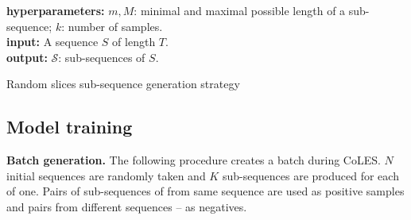 \documentclass[sigconf, anonymous]{acmart}
\begin{document}
\begin{algorithm}
    \SetAlgoLined
    \textbf{hyperparameters:}
        $m, M$: minimal and maximal possible length of a sub-sequence;
        $k$: number of samples.
    \\ %
    \textbf{input:}
        A sequence $S$ of length $T$.
    \\
    \textbf{output:}
        $\mathcal{S}$: sub-sequences of $S$.
    \\
    \BlankLine
    \caption{Random slices sub-sequence generation strategy}
    \label{alg-slce-ss}
\end{algorithm}


\subsection{Model training} \label{sec-training}

\textbf{Batch generation.} The following procedure creates a batch during CoLES. $N$ initial
sequences are randomly taken and $K$ sub-sequences are produced for each of one. Pairs of
sub-sequences of from same sequence are used as positive samples and pairs from different
sequences -- as negatives.

\end{document}

